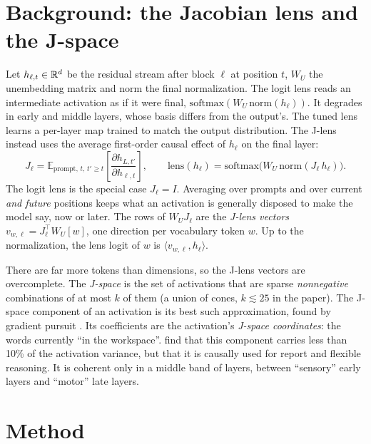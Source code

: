 \section{Background: the Jacobian lens and the J-space}
\label{sec:background}

Let $h_{\ell,t}\in\mathbb{R}^{d}$ be the residual stream after block $\ell$ at position $t$, $W_U$
the unembedding matrix and $\mathrm{norm}$ the final normalization. The logit lens
\citep{nostalgebraist2020logitlens} reads an intermediate activation as if it were final,
$\mathrm{softmax}(W_U\,\mathrm{norm}(h_\ell))$. It degrades in early and middle layers,
whose basis differs from the output's. The tuned lens \citep{belrose2023tuned} learns a
per-layer map trained to match the output distribution. The J-lens instead uses the average
first-order causal effect of $h_\ell$ on the final layer:
\begin{equation}
  J_\ell = \mathbb{E}_{\text{prompt},\,t,\,t'\ge t}\!\left[\frac{\partial h_{L,t'}}{\partial h_{\ell,t}}\right],
  \qquad
  \mathrm{lens}(h_\ell) = \mathrm{softmax}\big(W_U\,\mathrm{norm}(J_\ell\,h_\ell)\big).
\end{equation}
The logit lens is the special case $J_\ell=I$. Averaging over prompts and over current
\emph{and future} positions keeps what an activation is generally disposed to make the model
say, now or later. The rows of $W_U J_\ell$ are the \emph{J-lens vectors}
$v_{w,\ell}=J_\ell^\top W_U[w]$, one direction per vocabulary token $w$. Up to the
normalization, the lens logit of $w$ is $\langle v_{w,\ell},h_\ell\rangle$.

There are far more tokens than dimensions, so the J-lens vectors are overcomplete. The
\emph{J-space} is the set of activations that are sparse \emph{nonnegative} combinations of
at most $k$ of them (a union of cones, $k\lesssim 25$ in the paper). The J-space component of
an activation is its best such approximation, found by gradient pursuit
\citep{blumensath2008gradient}. Its coefficients are the activation's \emph{J-space
coordinates}: the words currently ``in the workspace''. \citet{gurnee2026workspace} find that
this component carries less than 10\% of the activation variance, but that it is causally
used for report and flexible reasoning. It is coherent only in a middle band of layers,
between ``sensory'' early layers and ``motor'' late layers.

\section{Method}
\label{sec:method}

